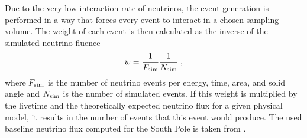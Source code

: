 Due to the very low interaction rate of neutrinos, the event generation is performed in a way that forces every event to interact in a chosen sampling volume. The weight of each event is then calculated as the inverse of the simulated neutrino fluence
\begin{equation}
    w = \frac{1}{F_{\mathrm{sim}}} \frac{1}{N_{\mathrm{sim}}}
    \;,
    \labeq{neutrino_generation_weight}
\end{equation}
where $F_{\rm{sim}}$ is the number of neutrino events per energy, time, area, and solid angle and $N_{\rm{sim}}$ is the number of simulated events. If this weight is multiplied by the livetime and the theoretically expected neutrino flux for a given physical model, it results in the number of events that this event would produce. The used baseline neutrino flux computed for the South Pole is taken from .

